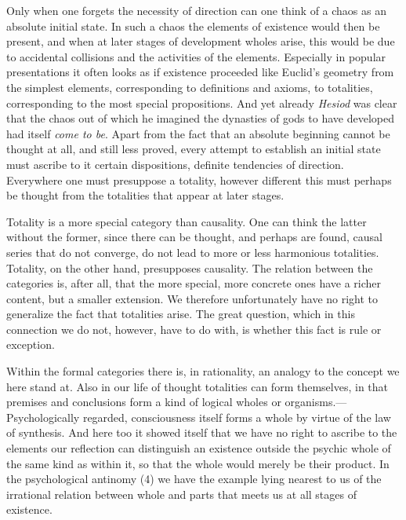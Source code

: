 \documentclass[12pt,a4paper]{book}
\newcommand{\opage}[1]{\marginnote{\footnotesize\textit{[#1]}}}
\begin{document}
Only when one forgets the necessity of direction can one think of a chaos as
an absolute initial state. In such a chaos the elements of existence would
then be present, and when at later stages of development wholes arise, this
would be due to accidental collisions and the activities of the elements.
Especially in popular presentations it often looks as if existence proceeded
like Euclid's geometry from the simplest elements, corresponding to
definitions and axioms, to totalities, corresponding to the most special
propositions. And yet already \emph{Hesiod} was clear that the chaos out of
which he imagined the dynasties of gods to have developed had itself \emph{come
to be}. Apart from the fact that an absolute beginning cannot be thought at
all, and still less proved, every attempt to establish an initial state must
ascribe to it certain dispositions, definite tendencies of direction.
Everywhere one must presuppose a totality, however different this must perhaps
be thought from the totalities that appear at later stages.

Totality is a more special category than causality. One can think the latter
without the former, since there can be thought, and perhaps are found, causal
series that do not converge, do not lead to more or less harmonious
totalities. Totality, on the other hand, presupposes causality. The relation
between the categories \opage{221}is, after all, that the more special, more concrete
ones have a richer content, but a smaller extension. We therefore
unfortunately have no right to generalize the fact that totalities arise. The
great question, which in this connection we do not, however, have to do with,
is whether this fact is rule or exception.

Within the formal categories there is, in rationality, an analogy to the
concept we here stand at. Also in our life of thought totalities can form
themselves, in that premises and conclusions form a kind of logical wholes or
organisms.---Psychologically regarded, consciousness itself forms a whole by
virtue of the law of synthesis. And here too it showed itself that we have no
right to ascribe to the elements our reflection can distinguish an existence
outside the psychic whole of the same kind as within it, so that the whole
would merely be their product. In the psychological antinomy (4) we have the
example lying nearest to us of the irrational relation between whole and parts
that meets us at all stages of existence.
\end{document}
